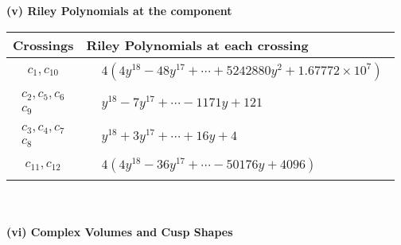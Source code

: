\documentclass[1p]{elsarticle_modified}
\theoremstyle{definition}
\begin{document}
\newpage\renewcommand{\arraystretch}{1}
\flushleft \textbf{(v) Riley Polynomials at the component}\newline \\
\begin{tabular}{m{50pt}|m{274pt}}
Crossings & \hspace{64pt}Riley Polynomials at each crossing \\
\hline $$\begin{aligned}c_{1},c_{10}\end{aligned}$$&$\begin{aligned}
&4(4 y^{18}-48 y^{17}+\cdots+5242880 y^{2}+1.67772\times10^{7})
\end{aligned}$\\
\hline $$\begin{aligned}c_{2},c_{5},c_{6}\\c_{9}\end{aligned}$$&$\begin{aligned}
&y^{18}-7 y^{17}+\cdots-1171 y+121
\end{aligned}$\\
\hline $$\begin{aligned}c_{3},c_{4},c_{7}\\c_{8}\end{aligned}$$&$\begin{aligned}
&y^{18}+3 y^{17}+\cdots+16 y+4
\end{aligned}$\\
\hline $$\begin{aligned}c_{11},c_{12}\end{aligned}$$&$\begin{aligned}
&4(4 y^{18}-36 y^{17}+\cdots-50176 y+4096)
\end{aligned}$\\
\hline
\end{tabular}\\~\\
\newpage\flushleft \textbf{(vi) Complex Volumes and Cusp Shapes}
\end{document}
